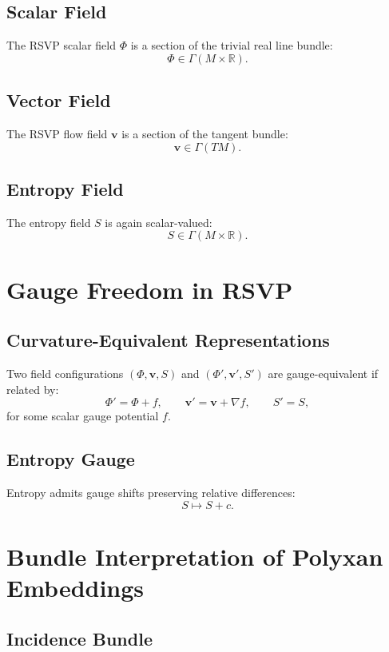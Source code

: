 \subsection{Scalar Field}

The RSVP scalar field $\Phi$ is a section of the trivial real line bundle:
\[
\Phi \in \Gamma(M\times\mathbb{R}).
\]

\subsection{Vector Field}

The RSVP flow field $\mathbf{v}$ is a section of the tangent bundle:
\[
\mathbf{v} \in \Gamma(TM).
\]

\subsection{Entropy Field}

The entropy field $S$ is again scalar-valued:
\[
S \in \Gamma(M\times\mathbb{R}).
\]

\section{Gauge Freedom in RSVP}

\subsection{Curvature-Equivalent Representations}

Two field configurations $(\Phi,\mathbf{v},S)$ and $(\Phi',\mathbf{v}',S')$ are gauge-equivalent if related by:
\[
\Phi' = \Phi + f, \qquad \mathbf{v}' = \mathbf{v} + \nabla f, \qquad S' = S,
\]
for some scalar gauge potential $f$.

\subsection{Entropy Gauge}

Entropy admits gauge shifts preserving relative differences:
\[
S \mapsto S + c.
\]

\section{Bundle Interpretation of Polyxan Embeddings}

\subsection{Incidence Bundle}


